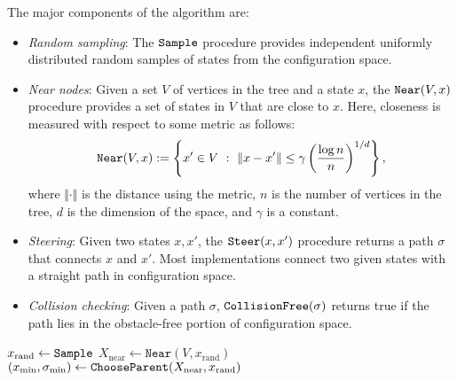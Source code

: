 \documentclass[letterpaper, 10pt, english, conference]{IEEEtran}
\begin{document}
The major components of the algorithm are:
\begin{itemize}
\item {\it Random sampling}:
%
The ${\tt Sample}$ procedure provides independent uniformly distributed random samples of states from the configuration space.

\item {\it Near nodes}:
% 
Given a set $V$ of vertices in the tree and a state $x$, the ${\tt
  Near}(V, x)$ procedure provides a set of states in $V$ that are close to
$x$. Here, closeness is measured with respect to some metric as
follows:
$$
{\tt Near}(V, x) := \left\{ x' \in V \,\,:\,\, \Vert x - x' \Vert \le \gamma
\left(\frac{\log n}{n}\right)^{1/d} \right\},
$$
where $\Vert \cdot \Vert$ is the distance using the metric, $n$ is the number of vertices in the tree, $d$ is the dimension of the space, and $\gamma$ is a constant.
 
\item {\it Steering}:
%
Given two states $x, x'$, the ${\tt Steer}(x,x')$ procedure returns a path $\sigma$ that connects $x$ and $x'$. Most implementations connect two given states with a straight path in configuration space.

\item {\it Collision checking}:
%
Given a path $\sigma$, ${\tt CollisionFree}(\sigma)$ returns true if the path lies in the obstacle-free portion of  configuration space.

\end{itemize}

\begin{center}
\begin{algorithm}
 { \label{line:iteration_start_orig}
	$x_\mathrm{rand} \leftarrow {\tt Sample}$\; \label{line:rrtstar:sample}
	$X_\mathrm{near} \leftarrow \mathtt{Near}(V ,x_\mathrm{rand})$\; \label{line:rrtstar:compute_near_orig}
	$(x_\mathrm{min},\sigma_\mathrm{min}) \leftarrow {\tt ChooseParent}(X_\mathrm{near}, x_\mathrm{rand})$\; \label{line:rrtstar:call_find_min_cost_parent}
	}
\;
\caption{${\tt RRT}^* ((V,E), N)$}
\label{algorithm:rrtstar_orig}
\end{algorithm}
\end{center}
\end{document}
